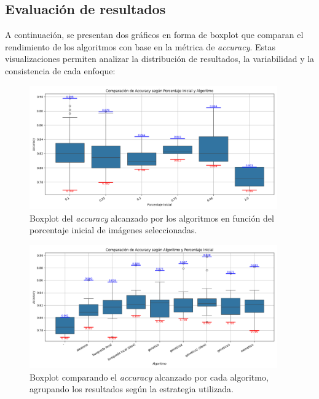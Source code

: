 \subsection{Evaluación de resultados}\label{sec:evaluacion-de-resultados}
A continuación, se presentan dos gráficos en forma de boxplot que comparan el rendimiento de los algoritmos con base en la métrica de \textit{accuracy}.
Estas visualizaciones permiten analizar la distribución de resultados, la variabilidad y la consistencia de cada enfoque:

\begin{figure}[!h]
    \centering
    \includegraphics[width=0.95\textwidth]{imagenes/mobilenet-BOXPLOT-accuracy-porcentaje}
    \caption{Boxplot del \textit{accuracy} alcanzado por los algoritmos en función del porcentaje inicial de imágenes seleccionadas.}
    \label{fig:boxplot-accuracy-porcentaje}
\end{figure}

\begin{figure}[!h]
    \centering
    \includegraphics[width=0.95\textwidth]{imagenes/mobilenet-BOXPLOT-accuracy-algoritmo}
    \caption{Boxplot comparando el \textit{accuracy} alcanzado por cada algoritmo, agrupando los resultados según la estrategia utilizada.}
    \label{fig:boxplot-accuracy-algoritmo}
\end{figure}

